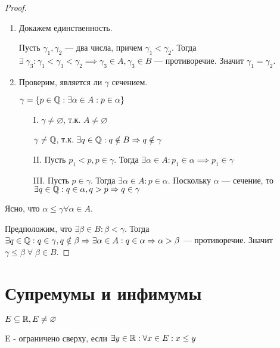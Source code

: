 \begin{proof}
    \begin{enumerate}
        \item Докажем единственность. 
        
        Пусть $\gamma_1, \gamma_2$ --- два числа, причем $\gamma_1 < \gamma_2$. Тогда $\exists \; \gamma_3: \gamma_1 < \gamma_3 < \gamma_2 \implies \gamma_3 \in A, \gamma_3 \in B$ --- противоречие. Значит $\gamma_1 = \gamma_2$.

        \item Проверим, является ли $\gamma$ сечением.
        
        $\gamma = \{p \in \mathbb{Q}: \exists \alpha \in A: p \in \alpha\}$

        \begin{enumerate}
            \item[I.] $\gamma \neq \varnothing$, т.к. $A \neq \varnothing$
            
            $\gamma \neq \mathbb{Q}$, т.к. $\exists q \in \mathbb{Q}: q \notin B \Rightarrow q \notin \gamma$
            \item[II.] Пусть $p_1 < p, p \in \gamma$. Тогда $\exists \alpha \in A: p_1 \in \alpha \implies p_1 \in \gamma$
            \item[III.] Пусть $p \in \gamma$. Тогда $\exists \alpha \in A: p \in \alpha$. Поскольку $\alpha$ --- сечение, то $\exists q \in \mathbb{Q}: q \in \alpha, q > p \Rightarrow q \in \gamma$
        \end{enumerate}
    \end{enumerate}

    Ясно, что $\alpha \leq \gamma \forall \alpha \in A$.

    Предположим, что $\exists \beta \in B: \beta < \gamma$. Тогда $\exists q \in \mathbb{Q}: q \in \gamma, q \notin \beta \Rightarrow \exists \alpha \in A: q \in \alpha \Rightarrow \alpha > \beta$ --- противоречие. Значит $\gamma \leq \beta \;  \forall \; \beta \in B$.
\end{proof}

\section{Супремумы и инфимумы}

\begin{definition}
    $E \subseteq \mathbb{R}, E \neq \varnothing$

    E - ограничено сверху, если $\exists y \in \mathbb{R}: \forall x \in E: x \leq y$
\end{definition}

